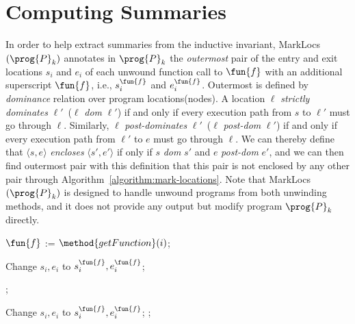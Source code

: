 
\section{Computing Summaries}\label{sec:computing-summary}
In order to help extract summaries from the inductive invariant,
MarkLocs$(\prog{P}_k)$ annotates in $\prog{P}_k$ the \emph{outermost} pair of
the entry and exit locations ${s_i}$ and ${e_i}$ of each unwound function call
to $\fun{f}$ with an additional superscript $\fun{f}$, i.e., $s_i^\fun{f}$ and
$e_i^\fun{f}$.
Outermost is defined by \emph{dominance} relation over program locations(nodes).
A location $\ell$ \emph{strictly dominates} $\ell'$~($\ell$ \emph{dom} $\ell'$)
if and only if every execution path from $s$ to $\ell'$ must go through $\ell$.
Similarly, $\ell$ \emph{post-dominates} $\ell'$~($\ell$ \emph{post-dom} $\ell'$)
if and only if every execution path from $\ell'$ to $e$ must go through $\ell$.
We can thereby define that $\langle s, e \rangle$ \emph{encloses}
$\langle s', e' \rangle$ if only if $s$ \emph{dom} $s'$ and $e$ \emph{post-dom}
$e'$,
and we can then find outermost pair with this definition that this pair is not
enclosed by any other pair through Algorithm~\ref{algorithm:mark-locations}.
Note that MarkLocs$(\prog{P}_k)$ is designed to handle unwound programs from
both unwinding methods,
and it does not provide any output but modify program $\prog{P}_k$ directly.

\begin{algorithm}
\begin{doublespace}
  {
    {
      $\fun{f}$ := $\method{getFunction}(i)$;

      {
        Change $s_i, e_i$ to $s^\fun{f}_i, e^\fun{f}_i$;
      }
    }
    \Return;
  }
  {
    {
      {
        Change $s_i, e_i$ to $s^\fun{f}_i, e^\fun{f}_i$;
      }
    }
    \Return;
  }
\end{doublespace}
  \caption{
  $\textmd{MarkLocs}(\prog{P}_k)$}
  \label{algorithm:mark-locations}
\end{algorithm}

